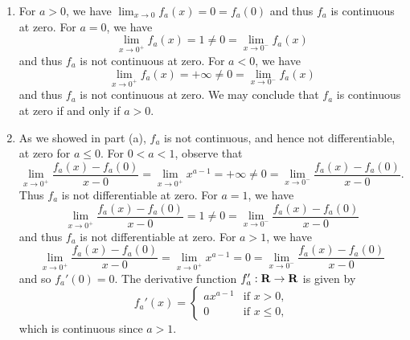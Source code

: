 \documentclass{lew98_solutions}
\begin{document}
\begin{solution}
    \begin{enumerate}
        \item For \( a > 0 \), we have \( \lim_{x \to 0} f_a(x) = 0 = f_a(0) \) and thus \( f_a \) is continuous at zero. For \( a = 0 \), we have
        \[
            \lim_{x \to 0^+} f_a(x) = 1 \neq 0 = \lim_{x \to 0^-} f_a(x)
        \]
        and thus \( f_a \) is not continuous at zero. For \( a < 0 \), we have
        \[
            \lim_{x \to 0^+} f_a(x) = +\infty \neq 0 = \lim_{x \to 0^-} f_a(x)
        \]
        and thus \( f_a \) is not continuous at zero. We may conclude that \( f_a \) is continuous at zero if and only if \( a > 0 \).

        \item As we showed in part (a), \( f_a \) is not continuous, and hence not differentiable, at zero for \( a \leq 0 \). For \( 0 < a < 1 \), observe that
        \[
            \lim_{x \to 0^+} \frac{f_a(x) - f_a(0)}{x - 0} = \lim_{x \to 0^+} x^{a - 1} = +\infty \neq 0 = \lim_{x \to 0^-} \frac{f_a(x) - f_a(0)}{x - 0}.
        \]
        Thus \( f_a \) is not differentiable at zero. For \( a = 1 \), we have
        \[
            \lim_{x \to 0^+} \frac{f_a(x) - f_a(0)}{x - 0} = 1 \neq 0 = \lim_{x \to 0^-} \frac{f_a(x) - f_a(0)}{x - 0}
        \]
        and thus \( f_a \) is not differentiable at zero. For \( a > 1 \), we have
        \[
            \lim_{x \to 0^+} \frac{f_a(x) - f_a(0)}{x - 0} = \lim_{x \to 0^+} x^{a - 1} = 0 = \lim_{x \to 0^-} \frac{f_a(x) - f_a(0)}{x - 0}
        \]
        and so \( f_a'(0) = 0 \). The derivative function \( f_a' : \mathbf{R} \to \mathbf{R} \) is given by
        \[
            f_a'(x) = \begin{cases}
                a x^{a - 1} & \text{if } x > 0, \\
                0 & \text{if } x \leq 0,
            \end{cases}
        \]
        which is continuous since \( a > 1 \).


\end{enumerate}
\end{solution}
\end{document}
